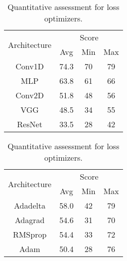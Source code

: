 \begin{table}[!htb]
    \centering
    \begin{minipage}[b]{.45\textwidth}
        \centering
            \begin{tabular}{cccc}\toprule
                \multirow{2}{*}{Architecture} & \multicolumn{3}{c}{Score} \\ \cline{2-4} 
                                            & Avg      & Min   & Max   \\ \hline
                Conv1D                        & 74.3 & 70 & 79 \\
                MLP                           & 63.8 & 61 & 66 \\
                Conv2D                        & 51.8 & 48 & 56 \\
                VGG                           & 48.5  & 34 & 55 \\
                ResNet                        & 33.5  & 28 & 42 \\\hline
            \end{tabular}
            \caption{Quantitative assessment for architectures.}
            \label{tab:quantitative_assessment_summary_arch}
    \end{minipage}
    \qquad
    \begin{minipage}[b]{.45\textwidth}
        \centering
            \begin{tabular}{cccc}\toprule
            \multirow{2}{*}{Architecture} & \multicolumn{3}{c}{Score} \\ \cline{2-4} 
                                        & Avg      & Min   & Max   \\ \hline
            Adadelta                      & 58.0   & 42 & 79 \\
            Adagrad                       & 54.6 & 31 & 70 \\
            RMSprop                       & 54.4 & 33 & 72 \\
            Adam                          & 50.4 & 28 & 76 \\\hline
            \end{tabular}
            \caption{Quantitative assessment for loss optimizers.}
            \label{tab:quantitative_assessment_summary_loss}
    \end{minipage}  
\end{table}


